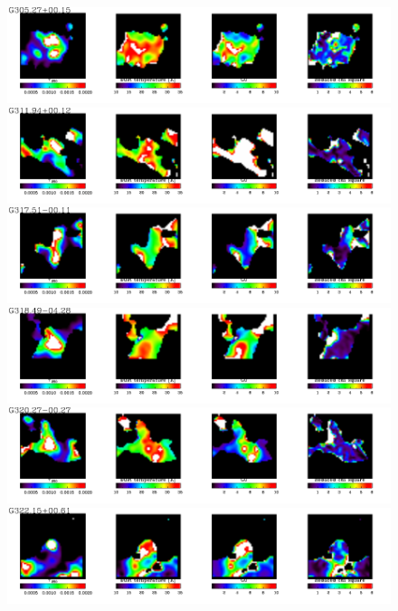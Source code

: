   \begin{figure}
\centering
\includegraphics[trim=0 2mm 0 0, clip, width=190mm]{appA/appA_78.pdf}
\includegraphics[trim=0 2mm 0 0, clip, width=190mm]{appA/appA_79.pdf}
\includegraphics[trim=0 2mm 0 0, clip, width=190mm]{appA/appA_80.pdf}
\includegraphics[trim=0 2mm 0 0, clip, width=190mm]{appA/appA_81.pdf}
\includegraphics[trim=0 2mm 0 0, clip, width=190mm]{appA/appA_82.pdf}
\includegraphics[trim=0 2mm 0 0, clip, width=190mm]{appA/appA_83.pdf}
  \end{figure}
  
